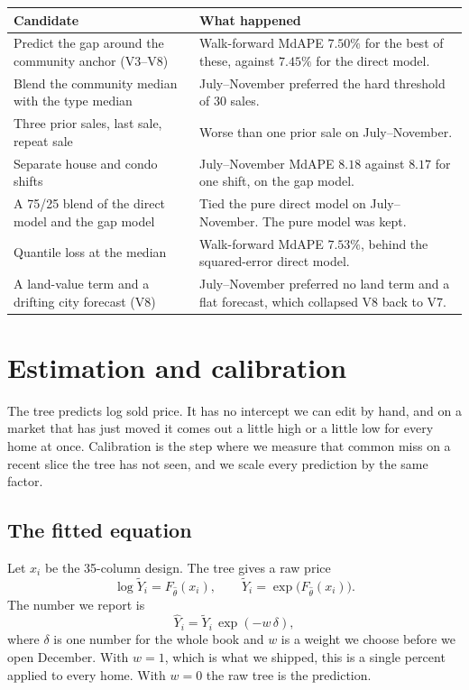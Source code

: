 \documentclass[11pt]{article}
\begin{document}
\begin{center}
\small
\begin{tabular}{p{4.4cm}p{9.0cm}}
\toprule
Candidate & What happened \\
\midrule
Predict the gap around the community anchor (V3--V8) & Walk-forward MdAPE \(7.50\%\) for the best of these, against \(7.45\%\) for the direct model. \\
Blend the community median with the type median & July--November preferred the hard threshold of 30 sales. \\
Three prior sales, last sale, repeat sale & Worse than one prior sale on July--November. \\
Separate house and condo shifts & July--November MdAPE \(8.18\) against \(8.17\) for one shift, on the gap model. \\
A 75/25 blend of the direct model and the gap model & Tied the pure direct model on July--November. The pure model was kept. \\
Quantile loss at the median & Walk-forward MdAPE \(7.53\%\), behind the squared-error direct model. \\
A land-value term and a drifting city forecast (V8) & July--November preferred no land term and a flat forecast, which collapsed V8 back to V7. \\
\bottomrule
\end{tabular}
\end{center}

\section{Estimation and calibration}
\label{sec:calibration}

The tree predicts log sold price. It has no intercept we can edit by hand, and on a market that has just moved it comes out a little high or a little low for every home at once. Calibration is the step where we measure that common miss on a recent slice the tree has not seen, and we scale every prediction by the same factor.

\subsection{The fitted equation}

Let \(x_i\) be the 35-column design. The tree gives a raw price
\[
\log \tilde Y_i = F_{\hat\theta}(x_i), \qquad \tilde Y_i = \exp\bigl(F_{\hat\theta}(x_i)\bigr).
\]
The number we report is
\[
\hat Y_i = \tilde Y_i \,\exp(-w\,\delta),
\]
where \(\delta\) is one number for the whole book and \(w\) is a weight we choose before we open December. With \(w = 1\), which is what we shipped, this is a single percent applied to every home. With \(w = 0\) the raw tree is the prediction.
\end{document}
